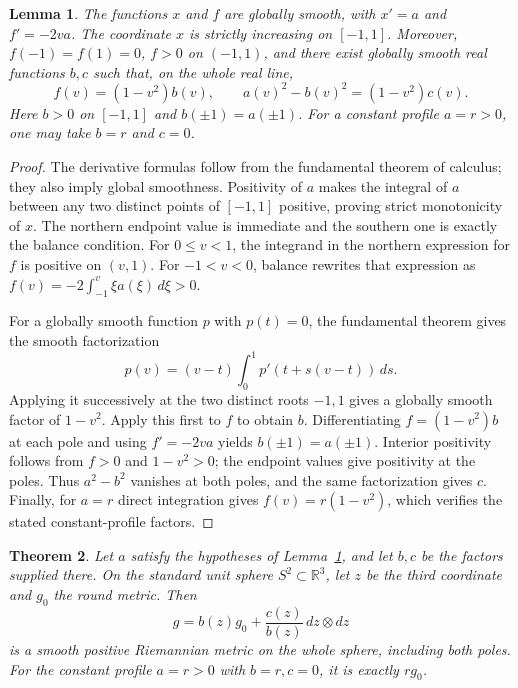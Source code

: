 \documentclass[11pt]{article}
\newtheorem{theorem}{Theorem}[section]
\newtheorem{lemma}[theorem]{Lemma}
\newcommand{\R}{\mathbb R}
\begin{document}
\begin{lemma}\label{lem:pole-factors}
The functions $x$ and $f$ are globally smooth, with $x'=a$ and
$f'=-2va$. The coordinate $x$ is strictly increasing on $[-1,1]$.
Moreover, $f(-1)=f(1)=0$, $f>0$ on $(-1,1)$, and there exist globally
smooth real functions $b,c$ such that, on the whole real line,
\begin{equation}\label{eq:pole-factors}
 f(v)=(1-v^2)b(v),\qquad a(v)^2-b(v)^2=(1-v^2)c(v).
\end{equation}
Here $b>0$ on $[-1,1]$ and $b(\pm1)=a(\pm1)$.
For a constant profile $a=r>0$, one may take $b=r$ and $c=0$.
\end{lemma}

\begin{proof}
The derivative formulas follow from the fundamental theorem of calculus;
they also imply global smoothness. Positivity of $a$ makes the integral
of $a$ between any two distinct points of $[-1,1]$ positive, proving strict
monotonicity of $x$. The northern endpoint value is immediate and the
southern one is exactly the balance condition. For $0\leq v<1$, the
integrand in the northern expression for $f$ is positive on $(v,1)$.
For $-1<v<0$, balance rewrites that expression as
$f(v)=-2\int_{-1}^v \xi a(\xi)\,d\xi>0$.

For a globally smooth function $p$ with $p(t)=0$, the fundamental theorem
gives the smooth factorization
\[
 p(v)=(v-t)\int_0^1 p'(t+s(v-t))\,ds.
\]
Applying it successively at the two distinct roots $-1,1$ gives a globally
smooth factor of $1-v^2$. Apply this first to $f$ to obtain $b$.
Differentiating $f=(1-v^2)b$ at each pole and using $f'=-2va$ yields
$b(\pm1)=a(\pm1)$. Interior positivity follows from $f>0$ and $1-v^2>0$;
the endpoint values give positivity at the poles. Thus $a^2-b^2$ vanishes
at both poles, and the same factorization gives $c$.
Finally, for $a=r$ direct integration gives $f(v)=r(1-v^2)$, which verifies
the stated constant-profile factors.
\end{proof}

\begin{theorem}\label{thm:smooth-metric}
Let $a$ satisfy the hypotheses of Lemma~\ref{lem:pole-factors}, and let
$b,c$ be the factors supplied there. On the standard unit sphere
$S^2\subset\R^3$, let $z$ be the third coordinate and $g_0$ the round metric.
Then
\begin{equation}\label{eq:global-metric}
 g=b(z)g_0+\frac{c(z)}{b(z)}\,dz\otimes dz
\end{equation}
is a smooth positive Riemannian metric on the whole sphere, including both
poles. For the constant profile $a=r>0$ with $b=r,c=0$, it is exactly $r g_0$.
\end{theorem}
\end{document}
